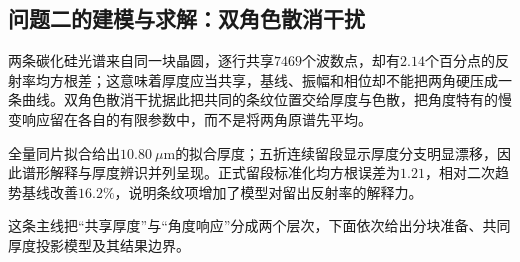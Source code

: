 \subsection{问题二的建模与求解：双角色散消干扰}

两条碳化硅光谱来自同一块晶圆，逐行共享$7469$个波数点，却有$2.14$个百分点的反射率均方根差；这意味着厚度应当共享，基线、振幅和相位却不能把两角硬压成一条曲线。双角色散消干扰据此把共同的条纹位置交给厚度与色散，把角度特有的慢变响应留在各自的有限参数中，而不是将两角原谱先平均。

全量同片拟合给出$10.80\ \mu\mathrm{m}$的拟合厚度；五折连续留段显示厚度分支明显漂移，因此谱形解释与厚度辨识并列呈现。正式留段标准化均方根误差为$1.21$，相对二次趋势基线改善$16.2\%$，说明条纹项增加了模型对留出反射率的解释力。

这条主线把“共享厚度”与“角度响应”分成两个层次，下面依次给出分块准备、共同厚度投影模型及其结果边界。

